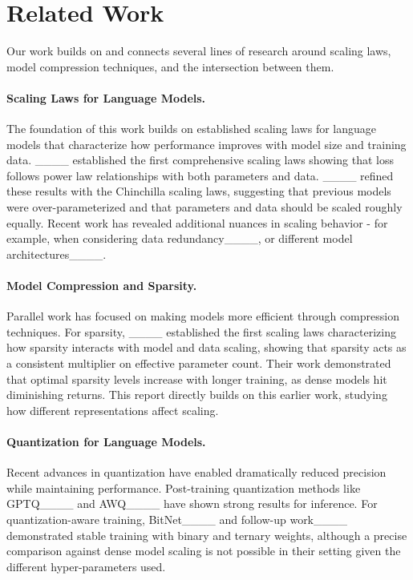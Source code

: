 \section{Related Work}
\label{sec:related-work}

Our work builds on and connects several lines of research around scaling laws, model compression techniques, and the intersection between them.

\paragraph{Scaling Laws for Language Models.} The foundation of this work builds on established scaling laws for language models that characterize how performance improves with model size and training data. ____ established the first comprehensive scaling laws showing that loss follows power law relationships with both parameters and data. ____ refined these results with the Chinchilla scaling laws, suggesting that previous models were over-parameterized and that parameters and data should be scaled roughly equally. Recent work has revealed additional nuances in scaling behavior - for example, when considering data redundancy____, or different model architectures____.

\paragraph{Model Compression and Sparsity.} Parallel work has focused on making models more efficient through compression techniques. For sparsity, ____ established the first scaling laws characterizing how sparsity interacts with model and data scaling, showing that sparsity acts as a consistent multiplier on effective parameter count. Their work demonstrated that optimal sparsity levels increase with longer training, as dense models hit diminishing returns. This report directly builds on this earlier work, studying how different representations affect scaling. 

\paragraph{Quantization for Language Models.} 
Recent advances in quantization have enabled dramatically reduced precision while maintaining performance. Post-training quantization methods like GPTQ____ and AWQ____ have shown strong results for inference. For quantization-aware training, BitNet____ and  follow-up work____ demonstrated stable training with binary and ternary weights, although a precise comparison against dense model scaling is not possible in their setting given the different hyper-parameters used. 

